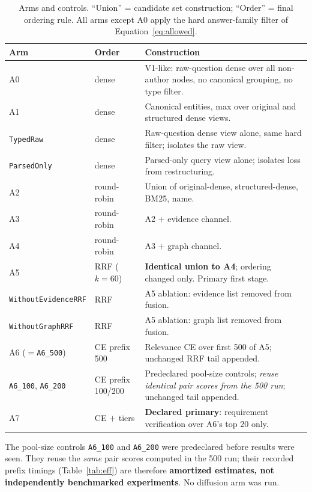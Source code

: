 \documentclass[11pt,a4paper]{article}
\begin{document}
\begin{table}[htbp]
\centering
\small
\caption{Arms and controls. ``Union'' = candidate set construction; ``Order'' = final ordering rule. All
arms except A0 apply the hard answer-family filter of Equation~\eqref{eq:allowed}.}
\label{tab:arms}
\begin{tabular}{llp{8.0cm}}
\toprule
Arm & Order & Construction \\
\midrule
A0 & dense & V1-like: raw-question dense over all non-author nodes, no canonical grouping, no type filter. \\
A1 & dense & Canonical entities, max over original and structured dense views. \\
\texttt{TypedRaw} & dense & Raw-question dense view alone, same hard filter; isolates the raw view. \\
\texttt{ParsedOnly} & dense & Parsed-only query view alone; isolates loss from restructuring. \\
A2 & round-robin & Union of original-dense, structured-dense, BM25, name. \\
A3 & round-robin & A2 $+$ evidence channel. \\
A4 & round-robin & A3 $+$ graph channel. \\
A5 & RRF ($k=60$) & \textbf{Identical union to A4}; ordering changed only. Primary first stage. \\
\texttt{WithoutEvidenceRRF} & RRF & A5 ablation: evidence list removed from fusion. \\
\texttt{WithoutGraphRRF} & RRF & A5 ablation: graph list removed from fusion. \\
A6 ($=$\texttt{A6\_500}) & CE prefix 500 & Relevance CE over first 500 of A5; unchanged RRF tail appended. \\
\texttt{A6\_100}, \texttt{A6\_200} & CE prefix 100/200 & Predeclared pool-size controls; \emph{reuse identical pair scores from the 500 run}; unchanged tail appended. \\
A7 & CE $+$ tiers & \textbf{Declared primary}: requirement verification over A6's top 20 only. \\
\bottomrule
\end{tabular}
\end{table}

The pool-size controls \texttt{A6\_100} and \texttt{A6\_200} were predeclared before results were seen. They
reuse the \emph{same} pair scores computed in the 500 run; their recorded prefix timings
(Table~\ref{tab:eff}) are therefore \textbf{amortized estimates, not independently benchmarked
experiments}. No diffusion arm was run.
\end{document}
